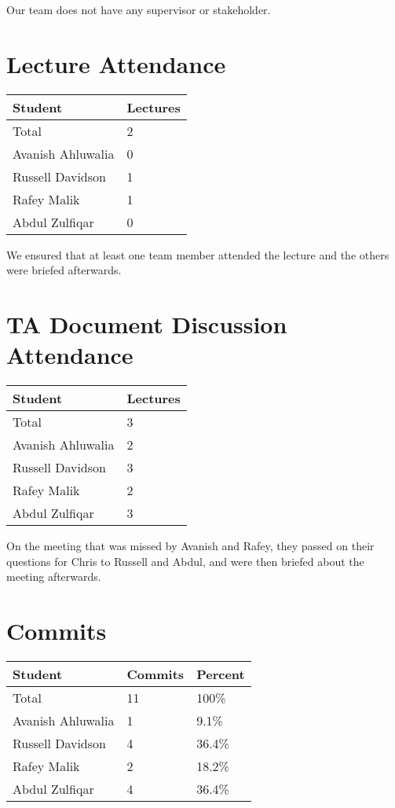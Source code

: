 \documentclass{article}
\begin{document}
Our team does not have any supervisor or stakeholder.

\section{Lecture Attendance}

\begin{table}[H]
\centering
\begin{tabular}{ll}
\toprule
\textbf{Student} & \textbf{Lectures}\\
\midrule
Total & 2\\
Avanish Ahluwalia & 0\\
Russell Davidson & 1\\
Rafey Malik & 1\\
Abdul Zulfiqar & 0\\
\bottomrule
\end{tabular}
\end{table}

We ensured that at least one team member attended the lecture and the others were briefed afterwards.

\section{TA Document Discussion Attendance}

\begin{table}[H]
\centering
\begin{tabular}{ll}
\toprule
\textbf{Student} & \textbf{Lectures}\\
\midrule
Total & 3\\
Avanish Ahluwalia & 2\\
Russell Davidson & 3\\
Rafey Malik & 2\\
Abdul Zulfiqar & 3\\
\bottomrule
\end{tabular}
\end{table}

On the meeting that was missed by Avanish and Rafey, they passed on their questions for Chris to Russell and Abdul, and were then briefed about the meeting afterwards.

\section{Commits}

\begin{table}[H]
\centering
\begin{tabular}{lll}
\toprule
\textbf{Student} & \textbf{Commits} & \textbf{Percent}\\
\midrule
Total & 11 & 100\% \\
Avanish Ahluwalia & 1 & 9.1\%\\
Russell Davidson & 4 & 36.4\%\\
Rafey Malik & 2 & 18.2\%\\
Abdul Zulfiqar & 4 & 36.4\%\\
\bottomrule
\end{tabular}
\end{table}
\end{document}
